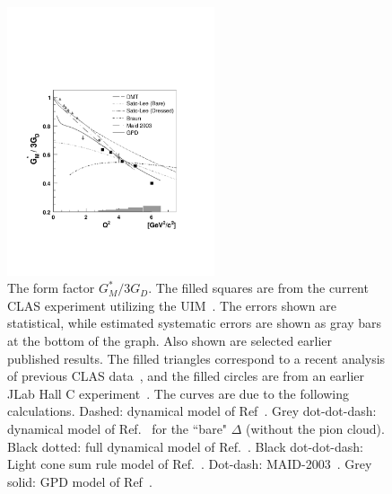 \documentclass[aps,prl,twocolumn,superscriptaddress]{revtex4}
\begin{document}
\begin{figure}[t]
\includegraphics[height=7.9cm, bb=55 140 505 560]{img/form_factor_bw}
 \caption{ The form factor $G_M^*/3G_D$. The filled squares are from the 
           current CLAS experiment utilizing the UIM~\cite{bib:Inna}.  
           The errors shown are statistical, while estimated systematic 
           errors are shown as gray bars at the bottom  of the graph. 
          Also shown are  selected earlier published results. The filled 
          triangles correspond to a recent analysis of previous CLAS 
          data~\cite{bib:colejoo, bib:innaprivate}, and the filled circles are 
          from an earlier JLab Hall C  experiment~\cite{bib:frolov, bib:DMT}. 
          The curves are due to the following calculations. 
          Dashed: dynamical model of Ref~\cite{bib:DMT}. Grey dot-dot-dash: 
          dynamical model of Ref.~\cite{bib:sato-lee} for the ``bare"  
          $\Delta$ (without the pion cloud). Black dotted: full dynamical 
          model of Ref.~\cite{bib:sato-lee}. Black dot-dot-dash:  Light 
          cone sum rule model of Ref.~\cite{bib:Braun-LC-soft}. 
          Dot-dash: MAID-2003~\cite{bib:maid}. Grey solid: GPD model 
          of Ref~\cite{bib:Stoler-Delta}.} 
 \label{fig:GM-JANR}
\end{figure} 
\end{document}
